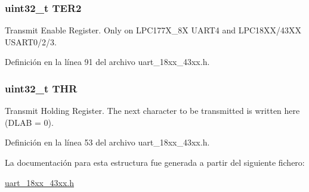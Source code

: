 \subsubsection[{\texorpdfstring{T\+E\+R2}{TER2}}]{ uint32\+\_\+t T\+E\+R2}\hypertarget{struct_l_p_c___u_s_a_r_t___t_a6929e8b6502e9904314c20fb3a79235e}{}\label{struct_l_p_c___u_s_a_r_t___t_a6929e8b6502e9904314c20fb3a79235e}
Transmit Enable Register. Only on L\+P\+C177\+X\+\_\+8X U\+A\+R\+T4 and L\+P\+C18\+X\+X/43\+XX U\+S\+A\+R\+T0/2/3. 

Definición en la línea 91 del archivo uart\+\_\+18xx\+\_\+43xx.\+h.

\subsubsection[{\texorpdfstring{T\+HR}{THR}}]{ uint32\+\_\+t T\+HR}\hypertarget{struct_l_p_c___u_s_a_r_t___t_a2f676c9b260c56f817a731fa0d5bd038}{}\label{struct_l_p_c___u_s_a_r_t___t_a2f676c9b260c56f817a731fa0d5bd038}
Transmit Holding Register. The next character to be transmitted is written here (D\+L\+AB = 0). 

Definición en la línea 53 del archivo uart\+\_\+18xx\+\_\+43xx.\+h.



La documentación para esta estructura fue generada a partir del siguiente fichero\+:\begin{DoxyCompactItemize}
\item 
\hyperlink{uart__18xx__43xx_8h}{uart\+\_\+18xx\+\_\+43xx.\+h}\end{DoxyCompactItemize}
